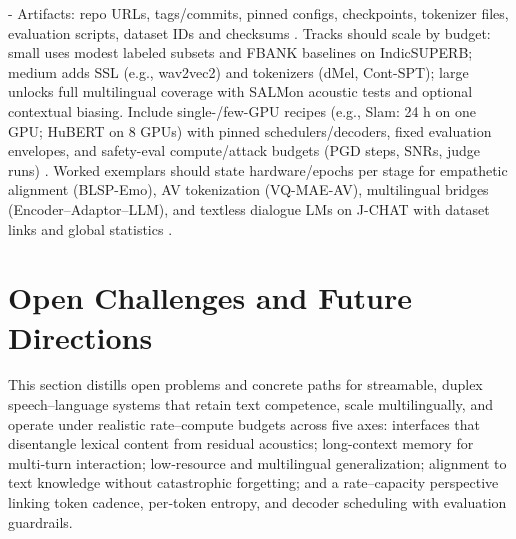 - Artifacts: repo URLs, tags/commits, pinned configs, checkpoints, tokenizer files, evaluation scripts, dataset IDs and checksums \cite{sun2025llasofoundationalframeworkreproduciblere,vashishth2024stabspeechtokenizerassessmentbenchmark,maimon2025salmonsuiteacousticlanguagemodelevaluati}.
Tracks should scale by budget: small uses modest labeled subsets and FBANK baselines on IndicSUPERB; medium adds SSL (e.g., wav2vec2) and tokenizers (dMel, Cont-SPT); large unlocks full multilingual coverage with SALMon acoustic tests and optional contextual biasing. Include single-/few-GPU recipes (e.g., Slam: 24 h on one GPU; HuBERT on 8 GPUs) with pinned schedulers/decoders, fixed evaluation envelopes, and safety-eval compute/attack budgets (PGD steps, SNRs, judge runs) \cite{bai2025dmelspeechtokenizationmadesimple,li2025continuousspeechtokenizertext,maimon2025salmonsuiteacousticlanguagemodelevaluati,maimon2025slammingtrainingspeechlanguagemodelonegp,chen2023reducingbarriersselfsupervisedlearninghu,peri2024speechguardexploringadversarialrobustnes}. Worked exemplars should state hardware/epochs per stage for empathetic alignment (BLSP-Emo), AV tokenization (VQ-MAE-AV), multilingual bridges (Encoder–Adaptor–LLM), and textless dialogue LMs on J-CHAT with dataset links and global statistics \cite{wang2024blspemotowardsempatheticlargespeechlangu,sadok2025vectorquantizedmaskedautoencoderaudiovis,li2025seewossubmissionmlcslmlessonslearnedspee,nakata2024jchatjapaneselargescalespokendialoguecor}.

















\section{Open Challenges and Future Directions} \label{sec:Open Challenges and Future Directions}

This section distills open problems and concrete paths for streamable, duplex speech–language systems that retain text competence, scale multilingually, and operate under realistic rate–compute budgets across five axes: interfaces that disentangle lexical content from residual acoustics; long-context memory for multi‑turn interaction; low‑resource and multilingual generalization; alignment to text knowledge without catastrophic forgetting; and a rate–capacity perspective linking token cadence, per‑token entropy, and decoder scheduling with evaluation guardrails.

